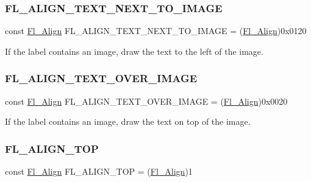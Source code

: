 \subsubsection{\texorpdfstring{F\+L\+\_\+\+A\+L\+I\+G\+N\+\_\+\+T\+E\+X\+T\+\_\+\+N\+E\+X\+T\+\_\+\+T\+O\+\_\+\+I\+M\+A\+GE}{FL\_ALIGN\_TEXT\_NEXT\_TO\_IMAGE}}
{\footnotesize\ttfamily const \hyperlink{_enumerations_8_h_a44e8bcd1e030e65e4f88cbae64a7c3e3}{Fl\+\_\+\+Align} F\+L\+\_\+\+A\+L\+I\+G\+N\+\_\+\+T\+E\+X\+T\+\_\+\+N\+E\+X\+T\+\_\+\+T\+O\+\_\+\+I\+M\+A\+GE = (\hyperlink{_enumerations_8_h_a44e8bcd1e030e65e4f88cbae64a7c3e3}{Fl\+\_\+\+Align})0x0120}

If the label contains an image, draw the text to the left of the image. \mbox{\label{_enumerations_8_h_ab6413c20d509320c27f498ef2d65ce3f}} 
\subsubsection{\texorpdfstring{F\+L\+\_\+\+A\+L\+I\+G\+N\+\_\+\+T\+E\+X\+T\+\_\+\+O\+V\+E\+R\+\_\+\+I\+M\+A\+GE}{FL\_ALIGN\_TEXT\_OVER\_IMAGE}}
{\footnotesize\ttfamily const \hyperlink{_enumerations_8_h_a44e8bcd1e030e65e4f88cbae64a7c3e3}{Fl\+\_\+\+Align} F\+L\+\_\+\+A\+L\+I\+G\+N\+\_\+\+T\+E\+X\+T\+\_\+\+O\+V\+E\+R\+\_\+\+I\+M\+A\+GE = (\hyperlink{_enumerations_8_h_a44e8bcd1e030e65e4f88cbae64a7c3e3}{Fl\+\_\+\+Align})0x0020}

If the label contains an image, draw the text on top of the image. \mbox{\label{_enumerations_8_h_a62b22e4022b39d90a2d3962ae144f2e8}} 
\subsubsection{\texorpdfstring{F\+L\+\_\+\+A\+L\+I\+G\+N\+\_\+\+T\+OP}{FL\_ALIGN\_TOP}}
{\footnotesize\ttfamily const \hyperlink{_enumerations_8_h_a44e8bcd1e030e65e4f88cbae64a7c3e3}{Fl\+\_\+\+Align} F\+L\+\_\+\+A\+L\+I\+G\+N\+\_\+\+T\+OP = (\hyperlink{_enumerations_8_h_a44e8bcd1e030e65e4f88cbae64a7c3e3}{Fl\+\_\+\+Align})1}


